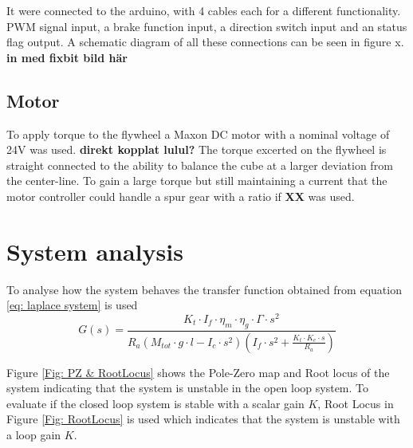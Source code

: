 \documentclass[a4paper,11pt]{kth-mag}
\begin{document}
It were connected to the arduino, with 4 cables each for a different functionality. PWM signal input, a brake function input, a direction switch input and an status flag output. A schematic diagram of all these connections can be seen in figure x.
\textbf{in med fixbit bild här}


\subsection{Motor}
To apply torque to the flywheel a Maxon DC motor with a nominal voltage of 24V was used. \textbf{direkt kopplat lulul?} The torque excerted on the flywheel is straight connected to the ability to balance the cube at a larger deviation from the center-line. To gain a large torque but still maintaining a current that the motor controller could handle a spur gear with a ratio if \textbf{XX} was used. 

\section{System analysis}
To analyse how the system behaves the transfer function obtained from equation \ref{eq: laplace system} is used
\begin{equation}\label{eq: transfer function final}
G(s) = \frac{K_t \cdot I_f \cdot \eta_m \cdot \eta_g \cdot \Gamma \cdot s^2}{R_a (M_{tot} \cdot g \cdot l - I_c \cdot s^2)(I_f \cdot s^2 + \frac{K_t \cdot K_e \cdot s}{R_a})} 
\end{equation}

Figure \ref{Fig: PZ & RootLocus} shows the Pole-Zero map and Root locus of the system indicating that the system is unstable in the open loop system. \cite{regler} To evaluate if the closed loop system is stable with a scalar gain $K$, Root Locus in Figure \ref{Fig: RootLocus} is used which indicates that the system is unstable with a loop gain $K$.
\end{document}

